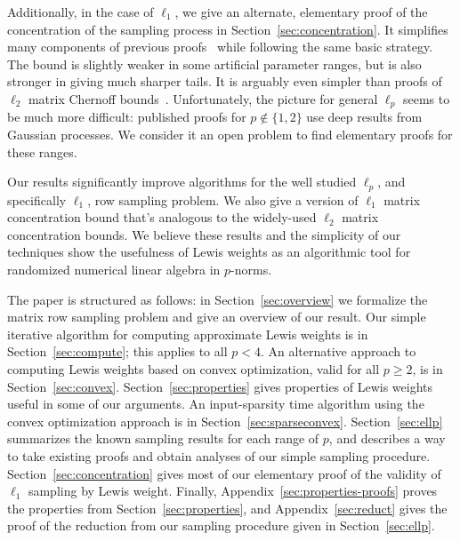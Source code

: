 Additionally, in the case of $\ell_1$, we give an alternate, elementary proof
of the concentration of the sampling process in Section~\ref{sec:concentration}.
It simplifies many components of previous
proofs~\cite{Talagrand90,Pisier99:book} while following the same basic strategy.
The bound is slightly weaker in some artificial parameter ranges, but is also stronger
in giving much sharper tails.  It is arguably even simpler than proofs of $\ell_2$ matrix Chernoff
bounds~\cite{Vershynin09,Harvey11}.  Unfortunately, the picture for general $\ell_p$ seems
to be much more difficult: published proofs for $p \not \in \{ 1, 2 \}$ use deep results from
Gaussian processes.  We consider it an open problem to find elementary proofs for these ranges.

Our results significantly improve algorithms for the well studied
$\ell_p$, and specifically $\ell_1$, row sampling problem.
We also give a version of $\ell_1$ matrix concentration bound that's
analogous to the widely-used $\ell_2$ matrix concentration bounds.
We believe these results and the simplicity of our techniques
show the usefulness of Lewis weights as an algorithmic tool
for randomized numerical linear algebra in $p$-norms.

The paper is structured as follows: in Section~\ref{sec:overview} we formalize
the matrix row sampling problem and give an overview of our result.
Our simple iterative algorithm for computing approximate Lewis weights is in Section~\ref{sec:compute};
this applies to all $p < 4$.
An alternative approach to computing Lewis weights based on convex optimization, valid for all $p \geq 2$,
is in Section~\ref{sec:convex}.
Section~\ref{sec:properties} gives properties of Lewis weights useful in some of our arguments.
An input-sparsity time algorithm using the convex optimization approach is in Section~\ref{sec:sparseconvex}.
Section~\ref{sec:ellp} summarizes the known sampling results for each range of $p$, and describes
a way to take existing proofs and obtain analyses of our simple sampling procedure.
Section~\ref{sec:concentration} gives most of our elementary proof of the validity
of $\ell_1$ sampling by Lewis weight.
Finally, Appendix~\ref{sec:properties-proofs} proves the properties from Section~\ref{sec:properties},
and Appendix~\ref{sec:reduct} gives the proof of the reduction from our sampling procedure
given in Section~\ref{sec:ellp}.
